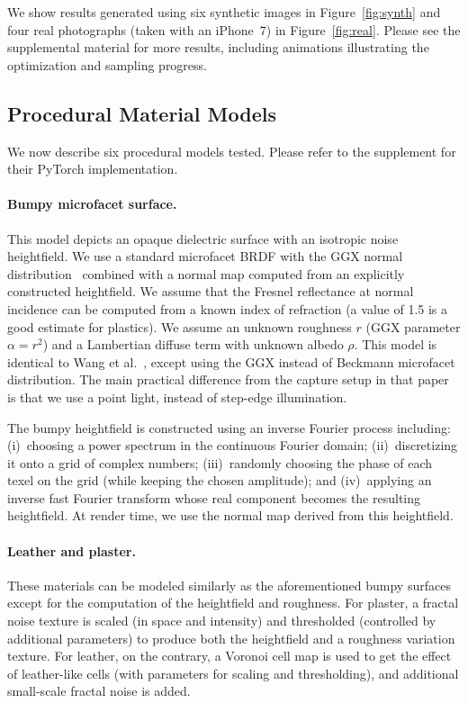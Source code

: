 We show results generated using six synthetic images in Figure~\ref{fig:synth} and four real photographs (taken with an iPhone~7) in Figure~\ref{fig:real}.
Please see the supplemental material for more results, including animations illustrating the optimization and sampling progress.





\subsection{Procedural Material  Models}
\label{ssec:proc_models}
%
We now describe six procedural models tested. Please refer to the supplement for their PyTorch implementation.

\paragraph{Bumpy microfacet surface.}
This model depicts an opaque dielectric surface with an isotropic noise heightfield. We use a standard microfacet BRDF with the GGX normal distribution~\cite{Walter2007} combined with a normal map computed from an explicitly constructed heightfield. We assume that the Fresnel reflectance at normal incidence can be computed from a known index of refraction (a value of 1.5 is a good estimate for plastics). We assume an unknown roughness $r$ (GGX parameter $\alpha=r^2$) and a Lambertian diffuse term with unknown albedo $\rho$. This model is identical to Wang et al.~\cite{Wang2011}, except using the GGX instead of Beckmann microfacet distribution. The main practical difference from the capture setup in that paper is that we use a point light, instead of step-edge illumination.

The bumpy heightfield is constructed using an inverse Fourier process including: (i)~choosing a power spectrum in the continuous Fourier domain; (ii)~discretizing it onto a grid of complex numbers; (iii)~randomly choosing the phase of each texel on the grid (while keeping the chosen amplitude); and (iv)~applying an inverse fast Fourier transform whose 
real component becomes the resulting heightfield. 
At render time, we use the normal map derived from this heightfield.

\paragraph{Leather and plaster.}
These materials can be modeled similarly as the aforementioned bumpy surfaces except for the computation of the heightfield and roughness.
For plaster, a fractal noise texture is scaled (in space and intensity) and thresholded (controlled by additional parameters) to produce both the heightfield and a roughness variation texture. For leather, on the contrary, a Voronoi cell map is used to get the effect of leather-like cells (with parameters for scaling and thresholding), and additional small-scale fractal noise is added.

